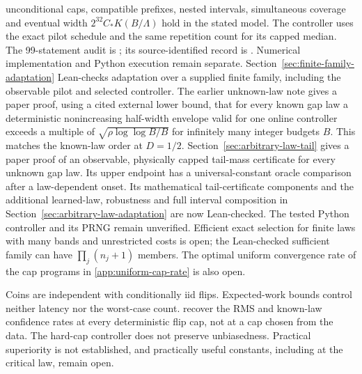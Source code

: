 unconditional caps, compatible prefixes, nested intervals, simultaneous
coverage and eventual width $2^{32}C_*K(B/\Lambda)$ hold in the stated
model. The controller uses the exact pilot schedule and the same repetition
count for its capped median. The 99-statement audit is
; its source-identified record
is . Numerical implementation
and Python execution remain separate. Section~\ref{sec:finite-family-adaptation}
Lean-checks adaptation over a supplied finite family, including the observable
pilot and selected controller. The earlier unknown-law note gives a paper proof, using a
cited external lower bound, that for every known gap law a deterministic
nonincreasing half-width envelope valid for one online controller exceeds
a multiple of $\sqrt{\rho\log\log B/B}$ for infinitely many integer
budgets $B$. This matches the known-law order at $D=1/2$.
Section~\ref{sec:arbitrary-law-tail} gives a paper proof of an observable,
physically capped tail-mass certificate for every unknown gap law. Its
upper endpoint has a universal-constant oracle comparison after a
law-dependent onset. Its mathematical tail-certificate components and
the additional learned-law, robustness and full interval composition in
Section~\ref{sec:arbitrary-law-adaptation} are now Lean-checked. The tested
Python controller and its PRNG remain unverified.
Efficient exact
selection for finite laws with many bands and unrestricted costs is open;
the Lean-checked sufficient family can have $\prod_j(n_j+1)$ members. The
optimal uniform convergence rate of the cap programs in
\cref{app:uniform-cap-rate} is also open.

Coins are independent with conditionally iid flips.
Expected-work bounds control neither latency nor the worst-case count.
 recover the RMS and known-law
confidence rates at every deterministic flip cap, not at a cap chosen from
the data. The hard-cap controller does not preserve unbiasedness.
Practical superiority is not established, and practically useful
constants, including at the critical law, remain open.
